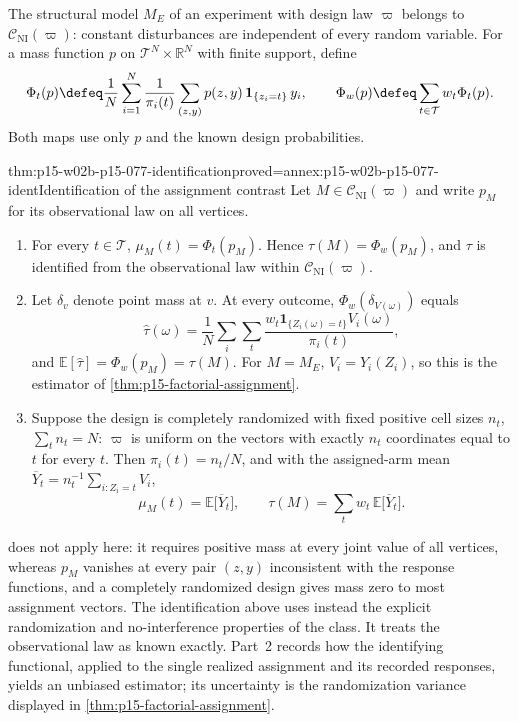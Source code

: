 The structural model \(M_E\) of an experiment with design law \(\varpi\)
belongs to \(\mathcal C_{\mathrm{NI}}(\varpi)\): constant disturbances are
independent of every random variable. For a mass function \(p\) on
\(\mathcal T^N\times\mathbb R^N\) with finite support, define
\[
 \Phi_t(p)\defeq\frac1N\sum_{i=1}^N\frac1{\pi_i(t)}
   \sum_{(z,y)}p(z,y)\,\mathbf 1_{\{z_i=t\}}\,y_i,
 \qquad
 \Phi_w(p)\defeq\sum_{t\in\mathcal T}w_t\Phi_t(p).
\]
Both maps use only \(p\) and the known design probabilities.

\begin{hbtheorem}{thm:p15-w02b-p15-077-identification}{proved=annex:p15-w02b-p15-077-ident}{Identification of the assignment contrast}
Let \(M\in\mathcal C_{\mathrm{NI}}(\varpi)\) and write \(p_M\) for its
observational law on all vertices.
\begin{enumerate}
\item For every \(t\in\mathcal T\),
      \(\mu_M(t)=\Phi_t(p_M)\). Hence \(\tau(M)=\Phi_w(p_M)\), and
      \(\tau\) is identified from the observational law within
      \(\mathcal C_{\mathrm{NI}}(\varpi)\).
\item Let \(\delta_v\) denote point mass at \(v\). At every outcome,
      \(\Phi_w(\delta_{V(\omega)})\) equals
      \[
       \widehat\tau(\omega)=\frac1N\sum_i\sum_t
        \frac{w_t\mathbf 1_{\{Z_i(\omega)=t\}}V_i(\omega)}{\pi_i(t)},
      \]
      and \(\mathbb E[\widehat\tau]=\Phi_w(p_M)=\tau(M)\). For
      \(M=M_E\), \(V_i=Y_i(Z_i)\), so this is the estimator of
      \cref{thm:p15-factorial-assignment}.
\item Suppose the design is completely randomized with fixed positive cell
      sizes \(n_t\), \(\sum_tn_t=N\): \(\varpi\) is uniform on the
      vectors with exactly \(n_t\) coordinates equal to \(t\) for every
      \(t\). Then \(\pi_i(t)=n_t/N\), and with the assigned-arm mean
      \(\overline Y_t=n_t^{-1}\sum_{i:Z_i=t}V_i\),
      \[
       \mu_M(t)=\mathbb E\bigl[\overline Y_t\bigr],\qquad
       \tau(M)=\sum_tw_t\,\mathbb E\bigl[\overline Y_t\bigr].
      \]
\end{enumerate}
\end{hbtheorem}

 does not apply here: it
requires positive mass at every joint value of all vertices, whereas
\(p_M\) vanishes at every pair \((z,y)\) inconsistent with the response
functions, and a completely randomized design gives mass zero to most
assignment vectors. The identification above uses instead the explicit
randomization and no-interference properties of the class. It treats the
observational law as known exactly. Part~2 records how the identifying
functional, applied to the single realized assignment and its recorded
responses, yields an unbiased estimator; its uncertainty is the
randomization variance displayed in \cref{thm:p15-factorial-assignment}.

